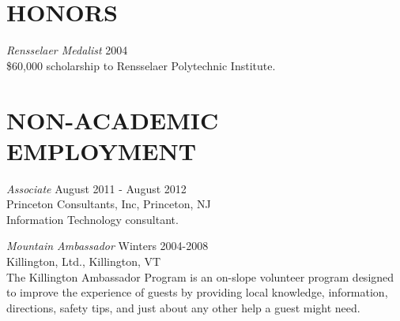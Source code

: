 \documentclass[line,overlapped]{res}
\begin{document}
\begin{resume}
 \section{HONORS}
         {\sl Rensselaer Medalist} \hfill 2004\\
         \$60,000 scholarship to Rensselaer Polytechnic Institute.
\newpage
 \section{NON-ACADEMIC\\EMPLOYMENT}             
         {\sl Associate} \hfill August 2011 - August 2012\\
         Princeton Consultants, Inc, Princeton, NJ\\
         Information Technology consultant.

         {\it Mountain Ambassador} \hfill Winters 2004-2008\\
         Killington, Ltd., Killington, VT \\
         The Killington Ambassador Program is an on-slope volunteer program
         designed to improve the experience of guests by providing local knowledge, 
         information, directions, safety tips, and just about any other help a guest might need.


\end{resume}
\end{document}
